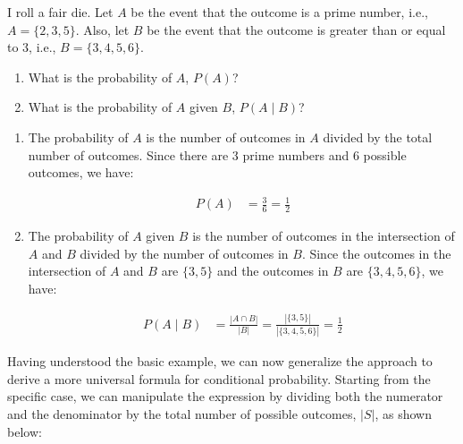 \begin{example}
I roll a fair die. Let \( A \) be the event that the outcome is a prime number, i.e., \( A = \{2, 3, 5\} \). Also, let \( B \) be the event that the outcome is greater than or equal to 3, i.e., \( B = \{3, 4, 5, 6\} \).

\begin{enumerate}[label=(\alph*)]
    \item What is the probability of \( A \), \( P(A) \)?
    \item What is the probability of \( A \) given \( B \), \( P(A \mid B) \)?
\end{enumerate}

\end{example}

\begin{solution}
    \begin{enumerate}[label=(\alph*)]
        \item The probability of \( A \) is the number of outcomes in \( A \) divided by the total number of outcomes. Since there are 3 prime numbers and 6 possible outcomes, we have:
    
        \begin{align*}
        P(A) &= \frac{3}{6} = \frac{1}{2}
        \end{align*}
    
        \item The probability of \( A \) given \( B \) is the number of outcomes in the intersection of \( A \) and \( B \) divided by the number of outcomes in \( B \). Since the outcomes in the intersection of \( A \) and \( B \) are \(\{3, 5\}\) and the outcomes in \( B \) are \(\{3, 4, 5, 6\}\), we have: \vspace{0.4cm}
    
        \begin{align*}
        P(A \mid B) &=\frac{|A \cap B|}{|B|} = \frac{|\{3,5\}|}{|\{3,4, 5, 6\}|} = \frac{1}{2}
        \end{align*}

    \end{enumerate}
\end{solution}

Having understood the basic example, we can now generalize the approach to derive a more universal formula for conditional probability. Starting from the specific case, we can manipulate the expression by dividing both the numerator and the denominator by the total number of possible outcomes, \( |S| \), as shown below:

